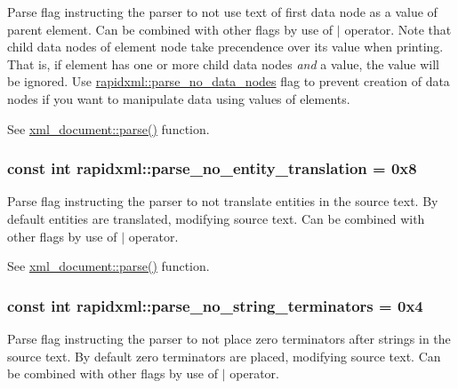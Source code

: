 \label{d7/d8a/namespacerapidxml_a00e6fea134b786ea6efeed1c8bc4a668}
Parse flag instructing the parser to not use text of first data node as a value of parent element. Can be combined with other flags by use of $|$ operator. Note that child data nodes of element node take precendence over its value when printing. That is, if element has one or more child data nodes {\itshape and\/} a value, the value will be ignored. Use \hyperlink{namespacerapidxml_ac2d21ef14a4e8936b94aca5d38b1a74d}{rapidxml::parse\_\-no\_\-data\_\-nodes} flag to prevent creation of data nodes if you want to manipulate data using values of elements. \par
\par
 See \hyperlink{classrapidxml_1_1xml__document_ad510b0c5fd8bf0180a55ffb2476e59e4}{xml\_\-document::parse()} function. \hypertarget{namespacerapidxml_a89113c103ffaf77615d1aa330c8dcca8}{
\subsubsection[{parse\_\-no\_\-entity\_\-translation}]{\setlength{\rightskip}{0pt plus 5cm}const int {\bf rapidxml::parse\_\-no\_\-entity\_\-translation} = 0x8}}
\label{d7/d8a/namespacerapidxml_a89113c103ffaf77615d1aa330c8dcca8}
Parse flag instructing the parser to not translate entities in the source text. By default entities are translated, modifying source text. Can be combined with other flags by use of $|$ operator. \par
\par
 See \hyperlink{classrapidxml_1_1xml__document_ad510b0c5fd8bf0180a55ffb2476e59e4}{xml\_\-document::parse()} function. \hypertarget{namespacerapidxml_af3fc88ba6bee33482a2db81b1da36ea1}{
\subsubsection[{parse\_\-no\_\-string\_\-terminators}]{\setlength{\rightskip}{0pt plus 5cm}const int {\bf rapidxml::parse\_\-no\_\-string\_\-terminators} = 0x4}}
\label{d7/d8a/namespacerapidxml_af3fc88ba6bee33482a2db81b1da36ea1}
Parse flag instructing the parser to not place zero terminators after strings in the source text. By default zero terminators are placed, modifying source text. Can be combined with other flags by use of $|$ operator. \par
